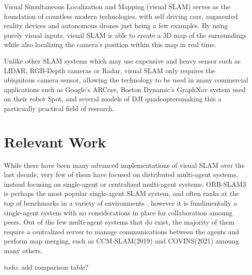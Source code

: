 
\label{sec:1}
Visual Simultaneous Localization and Mapping (visual SLAM) serves as the foundation of countless modern technologies, with self driving cars, augmented reality devices and autonomous drones just being a few examples. By using purely visual inputs, visual SLAM is able to create a 3D map of the surroundings while also localizing the camera's position within this map in real time.

Unlike other SLAM systems which may use expensive and heavy sensor such as LIDAR, RGB-Depth cameras or Radar, visual SLAM only requires the ubiquitous camera sensor, allowing the technology to be used in many commercial applications such as Google's ARCore\footnotemark[1], Boston Dynamic's GraphNav system used on their robot Spot\footnotemark[2], and several models of DJI quadcopters\footnotemark[3] making this a particually practical field of research.


\section{Relevant Work}
\label{sec:1.1}
While there have been many advanced implementations of visual SLAM over the last decade, very few of them have focused on distributed multi-agent systems, instead focusing on single-agent or centralized multi-agent systems. ORB-SLAM3 \autocite{ORBSLAM3_TRO} is perhaps the most popular single-agent SLAM system, and often ranks at the top of benchmarks in a variety of environments \autocite{DBLP:journals/corr/abs-2108-01654}, however it is fundimentally a single-agent system with no considerations in place for collaboration amoung peers. Out of the few multi-agent systems that do exist, the majority of them require a centralized server to manage communications between the agents and perform map merging, such as CCM-SLAM(2019) \autocite{schmuck2019ccm} and COVINS(2021) \autocite{schmuck2021covins} amoung many others.

todo: add comparison table?

